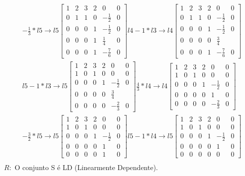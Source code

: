 \documentclass[10pt]{article}
\begin{document}
$$
\begin{aligned}
& -\frac{1}{3} * l5\rightarrow l5\left[\begin{array}{ccccc|c}1 & 2 & 3 & 2 & 0 & 0 \\0 & 1 & 1 & 0 & -\frac{1}{2} & 0\\0 & 0 & 0 & 1 & -\frac{1}{2} & 0 \\0 & 0 & 0 & 1 & \frac{1}{4} & 0 \\0 & 0 & 0 & 1 & -\frac{7}{6} & 0\end{array}\right] l4 - 1 * l3 \rightarrow l4 \left[\begin{array}{ccccc|c}1 & 2 & 3 & 2 & 0 & 0 \\0 & 1 & 1 & 0 & -\frac{1}{2} & 0 \\0 & 0 & 0 & 1 & -\frac{1}{2} & 0 \\0 & 0 & 0 & 0 & \frac{3}{4} \\0 & 0 & 0 & 1 & -\frac{7}{6} & 0\end{array}\right] \\
& l5 - 1 * l3 \rightarrow l5\left[\begin{array}{ccccc|c}1 & 2 & 3 & 2 & 0 & 0 \\1 & 0 & 1 & 0 & 0 & 0 \\0 & 0 & 0 & 1 & -\frac{1}{2} & 0 \\0 & 0 & 0 & 0 & \frac{3}{4} \\0 & 0 & 0 & 0 & -\frac{2}{3} & 0\end{array}\right] \frac{4}{3} * l4 \rightarrow l4\left[\begin{array}{ccccc|c}1 & 2 & 3 & 2 & 0 & 0 \\1 & 0 & 1 & 0 & 0 & 0 \\0 & 0 & 0 & 1 & -\frac{1}{2} & 0 \\0 & 0 & 0 & 0 & 1 & 0 \\0 & 0 & 0 & 0 & -\frac{2}{3} & 0\end{array}\right] \\
& -\frac{3}{2} * l5\rightarrow l5\left[\begin{array}{ccccc|c}1 & 2 & 3 & 2 & 0 & 0 \\1 & 0 & 1 & 0 & 0 & 0 \\0 & 0 & 0 & 1 & -\frac{1}{2} & 0 \\0 & 0 & 0 & 0 & 1 & 0 \\0 & 0 & 0 & 0 & 1 & 0\end{array}\right] l5 - 1 * l4 \rightarrow l5\left[\begin{array}{ccccc|c}1 & 2 & 3 & 2 & 0 & 0 \\1 & 0 & 1 & 0 & 0 & 0 \\0 & 0 & 0 & 1 & -\frac{1}{2} & 0 \\0 & 0 & 0 & 0 & 1 & 0 \\0 & 0 & 0 & 0 & 0 & 0\end{array}\right] \\
\end{aligned}
$$
$R:$ O conjunto S é LD (Linearmente Dependente).
\end{document}
